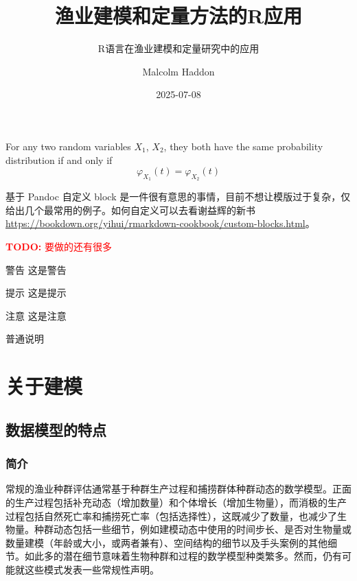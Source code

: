\documentclass[
  lang=cn,
  11pt,
  scheme=chinese,
  chinesefont=nofont,
  citestyle=gb7714-2015,
  bibstyle=gb7714-2015]{elegantbook}
\institute{A bookdown wrapper for ElegantBook}
\title{渔业建模和定量方法的R应用}
\subtitle{R语言在渔业建模和定量研究中的应用}
\author{Malcolm Haddon}
\date{2025-07-08}
\begin{document}
\maketitle

{
\hypersetup{linkcolor=Maroon}
\setcounter{tocdepth}{2}
\tableofcontents
}
\listoffigures
\listoftables
\mainmatter

\begin{lemma}
\protect\hypertarget{lem:chf-pdf}{}\label{lem:chf-pdf}For any two random variables \(X_1\), \(X_2\), they both have the same probability distribution if and only if \[\varphi _{X_1}(t)=\varphi _{X_2}(t)\]
\end{lemma}

基于 Pandoc 自定义 block 是一件很有意思的事情，目前不想让模版过于复杂，仅给出几个最常用的例子。如何自定义可以去看谢益辉的新书 \url{https://bookdown.org/yihui/rmarkdown-cookbook/custom-blocks.html}。

\textcolor{red}{\textbf{TODO: }{要做的还有很多}}

\begin{rmdwarn}{警告}
这是警告

\end{rmdwarn}

\begin{rmdtip}{提示}
这是提示

\end{rmdtip}

\begin{rmdnote}{注意}
这是注意

\end{rmdnote}

普通说明

\chapter{关于建模}\label{intro}

\section{数据模型的特点}\label{ux6570ux636eux6a21ux578bux7684ux7279ux70b9}

\subsection{简介}\label{ux7b80ux4ecb}

常规的渔业种群评估通常基于种群生产过程和捕捞群体种群动态的数学模型。正面的生产过程包括补充动态（增加数量）和个体增长（增加生物量），而消极的生产过程包括自然死亡率和捕捞死亡率（包括选择性），这既减少了数量，也减少了生物量。种群动态包括一些细节，例如建模动态中使用的时间步长、是否对生物量或数量建模（年龄或大小，或两者兼有）、空间结构的细节以及手头案例的其他细节。如此多的潜在细节意味着生物种群和过程的数学模型种类繁多。然而，仍有可能就这些模式发表一些常规性声明。
\end{document}
